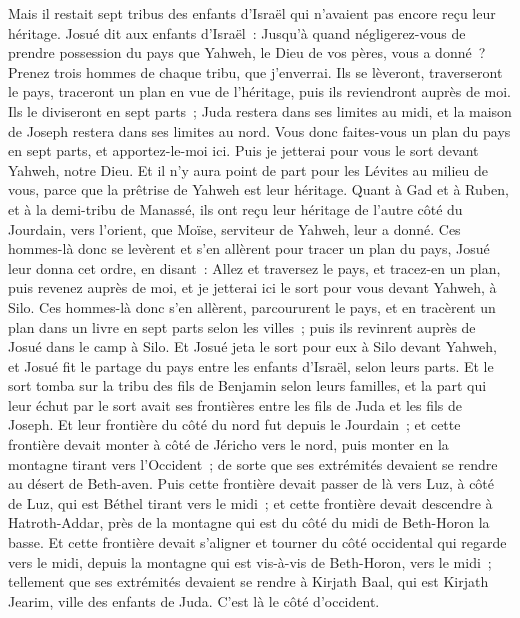 \begin{multicols}{2}
Mais il restait sept tribus des enfants d'Israël qui n'avaient pas encore reçu leur héritage.
Josué dit aux enfants d'Israël~: Jusqu'à quand négligerez-vous de prendre possession du pays que Yahweh, le Dieu de vos pères, vous a donné~?
Prenez trois hommes de chaque tribu, que j'enverrai. Ils se lèveront, traverseront le pays, traceront un plan en vue de l'héritage, puis ils reviendront auprès de moi.
Ils le diviseront en sept parts~; Juda restera dans ses limites au midi, et la maison de Joseph restera dans ses limites au nord.
Vous donc faites-vous un plan du pays en sept parts, et apportez-le-moi ici. Puis je jetterai pour vous le sort devant Yahweh, notre Dieu.
Et il n'y aura point de part pour les Lévites au milieu de vous, parce que la prêtrise de Yahweh est leur héritage. Quant à Gad et à Ruben, et à la demi-tribu de Manassé, ils ont reçu leur héritage de l'autre côté du Jourdain, vers l'orient, que Moïse, serviteur de Yahweh, leur a donné.
Ces hommes-là donc se levèrent et s'en allèrent pour tracer un plan du pays, Josué leur donna cet ordre, en disant~: Allez et traversez le pays, et tracez-en un plan, puis revenez auprès de moi, et je jetterai ici le sort pour vous devant Yahweh, à Silo.
Ces hommes-là donc s'en allèrent, parcoururent le pays, et en tracèrent un plan dans un livre en sept parts selon les villes~; puis ils revinrent auprès de Josué dans le camp à Silo.
Et Josué jeta le sort pour eux à Silo devant Yahweh, et Josué fit le partage du pays entre les enfants d'Israël, selon leurs parts.
Et le sort tomba sur la tribu des fils de Benjamin selon leurs familles, et la part qui leur échut par le sort avait ses frontières entre les fils de Juda et les fils de Joseph.
Et leur frontière du côté du nord fut depuis le Jourdain~; et cette frontière devait monter à côté de Jéricho vers le nord, puis monter en la montagne tirant vers l'Occident~; de sorte que ses extrémités devaient se rendre au désert de Beth-aven.
Puis cette frontière devait passer de là vers Luz, à côté de Luz, qui est Béthel tirant vers le midi~; et cette frontière devait descendre à Hatroth-Addar, près de la montagne qui est du côté du midi de Beth-Horon la basse.
Et cette frontière devait s'aligner et tourner du côté occidental qui regarde vers le midi, depuis la montagne qui est vis-à-vis de Beth-Horon, vers le midi~; tellement que ses extrémités devaient se rendre à Kirjath Baal, qui est Kirjath Jearim, ville des enfants de Juda. C'est là le côté d'occident.

\end{multicols}
